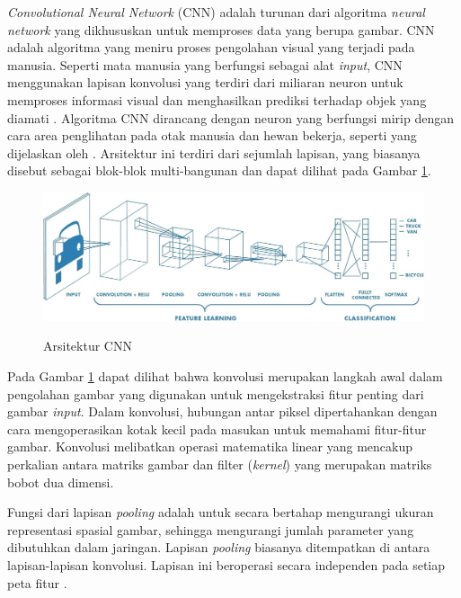 \par \textit{Convolutional Neural Network} (CNN) adalah turunan dari algoritma \textit{neural network} yang dikhususkan untuk memproses data yang berupa gambar. CNN adalah algoritma yang meniru proses pengolahan visual yang terjadi pada manusia. Seperti mata manusia yang berfungsi sebagai alat \textit{input}, CNN menggunakan lapisan konvolusi yang terdiri dari miliaran neuron untuk memproses informasi visual dan menghasilkan prediksi terhadap objek yang diamati \citep{kristiyanti2023machine}. Algoritma CNN dirancang dengan neuron yang berfungsi mirip dengan cara area penglihatan pada otak manusia dan hewan bekerja, seperti yang dijelaskan oleh \citep{henningsen2022modelling}. Arsitektur ini terdiri dari sejumlah lapisan, yang biasanya disebut sebagai blok-blok multi-bangunan dan dapat dilihat pada Gambar \ref{Arsitektur CNN}.


\begin{figure}[H]
    \centering
    {\includegraphics [width=\textwidth]{image/bab2/arsitektur-cnn.jpg}}
    \caption{Arsitektur CNN \citep{wardani2023klasifikasi}}
    \label{Arsitektur CNN}
\end{figure}

\par Pada Gambar \ref{Arsitektur CNN} dapat dilihat bahwa konvolusi merupakan langkah awal dalam pengolahan gambar yang digunakan untuk mengekstraksi fitur penting dari gambar \textit{input}. Dalam konvolusi, hubungan antar piksel dipertahankan dengan cara mengoperasikan kotak kecil pada masukan untuk memahami fitur-fitur gambar. Konvolusi melibatkan operasi matematika linear yang mencakup perkalian antara matriks gambar dan filter (\textit{kernel}) yang merupakan matriks bobot dua dimensi.

\par Fungsi dari lapisan \textit{pooling} adalah untuk secara bertahap mengurangi ukuran representasi spasial gambar, sehingga mengurangi jumlah parameter yang dibutuhkan dalam jaringan. Lapisan \textit{pooling} biasanya ditempatkan di antara lapisan-lapisan konvolusi. Lapisan ini beroperasi secara independen pada setiap peta fitur \citep{monedero2021cyber}.

